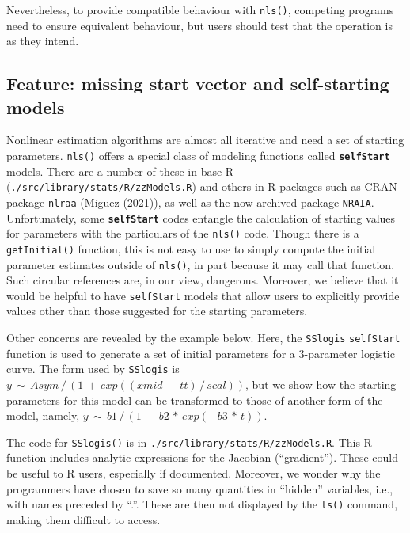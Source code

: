 Nevertheless, to provide compatible behaviour with \texttt{nls()}, competing programs
need to ensure equivalent behaviour, but users should test that the
operation is as they intend.

\hypertarget{feature-missing-start-vector-and-self-starting-models}{%
\subsection{Feature: missing start vector and self-starting models}\label{feature-missing-start-vector-and-self-starting-models}}

Nonlinear estimation algorithms are almost all iterative and need a set of starting
parameters. \texttt{nls()} offers a special class of modeling functions called
\textbf{\texttt{selfStart}} models. There are a number of these in base R
(\texttt{./src/library/stats/R/zzModels.R})
and others in R packages such as CRAN package \texttt{nlraa} (Miguez (2021)), as well as
the now-archived package \texttt{NRAIA}. Unfortunately, some \textbf{\texttt{selfStart}} codes
entangle the calculation of starting values for parameters
with the particulars of the \texttt{nls()} code. Though there is a \texttt{getInitial()} function,
this is not easy to use to simply compute the initial parameter estimates outside of
\texttt{nls()}, in part
because it may call that function. Such circular references are, in our view,
dangerous. Moreover, we believe that it would be helpful to have \texttt{selfStart}
models that allow users to explicitly provide values other than those suggested
for the starting parameters.

Other concerns are revealed by the example below. Here, the \texttt{SSlogis}
\texttt{selfStart} function is used to generate a set
of initial parameters for a 3-parameter logistic curve. The form used by \texttt{SSlogis}
is \(y \,\sim\, Asym\,/\, (1 \,+\, exp((xmid\,-\,tt)\,/\,scal))\), but we show
how the starting parameters for this model can be transformed to those of
another form of the model, namely, \(y \,\sim\, b1\,/\,(1 \,+\, b2\,*\,exp(-b3\,*\,t))\).

The code for \texttt{SSlogis()} is in \texttt{./src/library/stats/R/zzModels.R}.
This R function includes analytic expressions for the Jacobian (``gradient'').
These could be useful to R users, especially if documented. Moreover, we
wonder why the programmers have chosen to save so many quantities in ``hidden''
variables, i.e., with names preceded by ``.''. These are then not displayed by the
\texttt{ls()} command, making them difficult to access.

